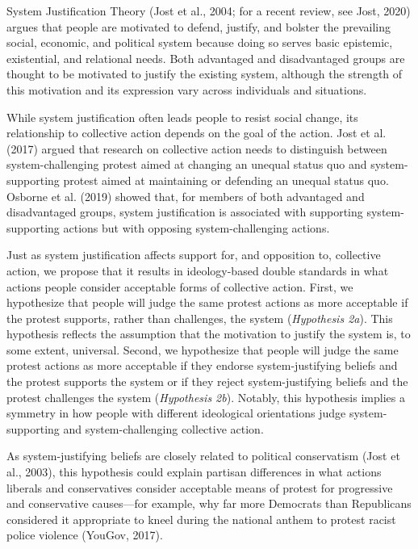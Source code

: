 \documentclass[12pt, letterpaper]{article}
\begin{document}
System Justification Theory (Jost et al., 2004; for a recent review, see
Jost, 2020) argues that people are motivated to defend, justify, and
bolster the prevailing social, economic, and political system because
doing so serves basic epistemic, existential, and relational needs. Both
advantaged and disadvantaged groups are thought to be motivated to
justify the existing system, although the strength of this motivation
and its expression vary across individuals and situations.

While system justification often leads people to resist social change,
its relationship to collective action depends on the goal of the action.
Jost et al. (2017) argued that research on collective action needs to
distinguish between system-challenging protest aimed at changing an
unequal status quo and system-supporting protest aimed at maintaining or
defending an unequal status quo. Osborne et al. (2019) showed that, for
members of both advantaged and disadvantaged groups, system
justification is associated with supporting system-supporting actions
but with opposing system-challenging actions.

Just as system justification affects support for, and opposition to,
collective action, we propose that it results in ideology-based double
standards in what actions people consider acceptable forms of collective
action. First, we hypothesize that people will judge the same protest
actions as more acceptable if the protest supports, rather than
challenges, the system (\emph{Hypothesis 2a}). This hypothesis reflects
the assumption that the motivation to justify the system is, to some
extent, universal. Second, we hypothesize that people will judge the
same protest actions as more acceptable if they endorse
system-justifying beliefs and the protest supports the system or if they
reject system-justifying beliefs and the protest challenges the system
(\emph{Hypothesis 2b}). Notably, this hypothesis implies a symmetry in
how people with different ideological orientations judge
system-supporting and system-challenging collective action.

As system-justifying beliefs are closely related to political
conservatism (Jost et al., 2003), this hypothesis could explain partisan
differences in what actions liberals and conservatives consider
acceptable means of protest for progressive and conservative
causes---for example, why far more Democrats than Republicans considered
it appropriate to kneel during the national anthem to protest racist
police violence (YouGov, 2017).
\end{document}
